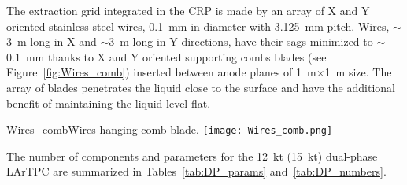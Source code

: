 The extraction grid integrated in the CRP is made by an array of X and Y oriented stainless steel wires, 0.1~mm in diameter with 3.125~mm
pitch.  Wires, $\sim$3~m long in X and $\sim$3~m long in Y directions, have their sags minimized to $\sim$0.1~mm thanks to X and Y oriented supporting combs blades (see Figure~\ref{fig:Wires_comb}) inserted between anode planes of 1~m$\times$1~m size. The array of blades penetrates the liquid close
to the surface and have the additional benefit of maintaining the liquid level flat.

\begin{cdrfigure}{Wires_comb}{Wires hanging comb blade.}
\texttt{[image: Wires\_comb.png]}
\end{cdrfigure}


The number of components and parameters for the 12~kt (15~kt) dual-phase LArTPC are summarized in Tables~\ref{tab:DP_params}
and~\ref{tab:DP_numbers}.


